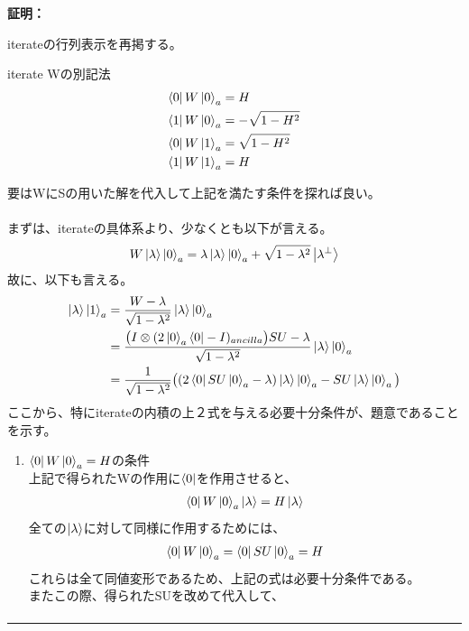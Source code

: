 \documentclass[a4paper,10.5pt]{article}
\numberwithin{equation}{section}
\newenvironment{proofbox}
{\begin{prooflabel}\textbf{証明：}\end{prooflabel}\vspace{0.8em}}
{\par\vspace{1em}\hrule\vspace{1em}}
\begin{document}
\begin{proofbox}
    iterateの行列表示を再掲する。
    \begin{resultbox}{iterate Wの別記法}
    \begin{align*}
        \bra{0}W\ket{0}_{a}&=H\\
        \bra{1}W\ket{0}_{a}&=-\sqrt{1-H^{2}}\\
        \bra{0}W\ket{1}_{a}&=\sqrt{1-H^{2}}\\
        \bra{1}W\ket{1}_{a}&=H
    \end{align*}
\end{resultbox}
要はWにSの用いた解を代入して上記を満たす条件を探れば良い。\\
    \\
    まずは、iterateの具体系より、少なくとも以下が言える。
    \begin{align*}
        W\ket{\lambda}\ket{0}_{a}=\lambda\ket{\lambda}\ket{0}_{a}+\sqrt{1-\lambda^{2}}\ket{\lambda^{\perp}}
    \end{align*}
    故に、以下も言える。
    \begin{align*}
        \ket{\lambda}\ket{1}_{a}&=\frac{W-\lambda}{\sqrt{1-\lambda^{2}}}\ket{\lambda}\ket{0}_{a}\\
        &=\frac{\big(I\otimes (2\ket{0}_{a}\bra{0}-I)_{ancilla}\big)S U-\lambda}{\sqrt{1-\lambda^{2}}}\ket{\lambda}\ket{0}_{a}\\
        &=\frac{1}{\sqrt{1-\lambda^{2}}}\big((2\bra{0}SU\ket{0}_{a}-\lambda)\ket{\lambda}\ket{0}_{a}-SU\ket{\lambda}\ket{0}_{a}\big)
    \end{align*}
    ここから、特にiterateの内積の上２式を与える必要十分条件が、題意であることを示す。\\
    \begin{enumerate}
        \item $\bra{0}W\ket{0}_{a}=H$の条件\\
        上記で得られたWの作用に$\bra{0}$を作用させると、
        \begin{align*}
            \bra{0}W\ket{0}_{a}\ket{\lambda}=H\ket{\lambda}
        \end{align*}
        全ての$\ket{\lambda}$に対して同様に作用するためには、
        \begin{align*}
            \bra{0}W\ket{0}_{a}=\bra{0}SU\ket{0}_{a}=H
        \end{align*}
        これらは全て同値変形であるため、上記の式は必要十分条件である。\\
        またこの際、得られたSUを改めて代入して、
        \begin{align*}

\end{align*}
\end{enumerate}
\end{proofbox}
\end{document}
